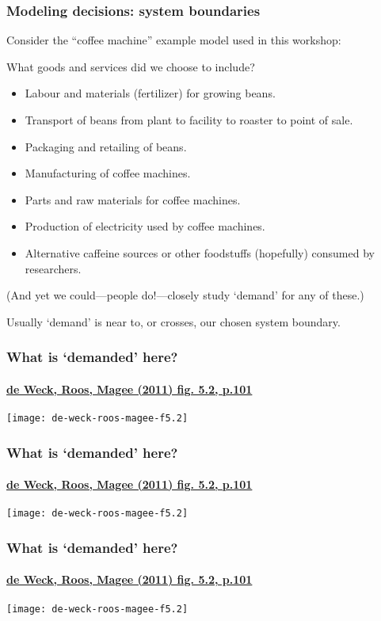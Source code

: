 \documentclass[12pt,aspectratio=169]{beamer}
\begin{document}
\begin{frame}
\frametitle{Modeling decisions: system boundaries}

Consider the “coffee machine” example model used in this workshop:

What goods and services did we choose  to include?

\medskip
\pause
{\footnotesize
\begin{itemize}
  \item Labour and materials (fertilizer) for growing beans.
  \item Transport of beans from plant to facility to roaster to point of sale.
  \item Packaging and retailing of beans.
  \item Manufacturing of coffee machines.
  \item Parts and raw materials for coffee machines.
  \item Production of electricity used by coffee machines.
  \item Alternative caffeine sources or other foodstuffs (hopefully) consumed by researchers.
\end{itemize}
(And yet we could—people do!—closely study ‘demand’ for any of these.)
}

\medskip\pause
\hspace{10mm}Usually ‘demand’ is near to, or crosses, our chosen system boundary.

\end{frame}

\begin{frame}
\frametitle{What is ‘demanded’ here?}
\framesubtitle{\href{https://mitpress.mit.edu/books/engineering-systems}{de Weck, Roos, Magee (2011) fig. 5.2, p.101}}

\texttt{[image: de-weck-roos-magee-f5.2]}
\end{frame}

\begin{frame}
\frametitle{What is ‘demanded’ here?}
\framesubtitle{\href{https://mitpress.mit.edu/books/engineering-systems}{de Weck, Roos, Magee (2011) fig. 5.2, p.101}}

\hspace{5mm}
\texttt{[image: de-weck-roos-magee-f5.2]}
\end{frame}

\begin{frame}
\frametitle{What is ‘demanded’ here?}
\framesubtitle{\href{https://mitpress.mit.edu/books/engineering-systems}{de Weck, Roos, Magee (2011) fig. 5.2, p.101}}

\hspace{3mm}
\texttt{[image: de-weck-roos-magee-f5.2]}
\end{frame}
\end{document}
